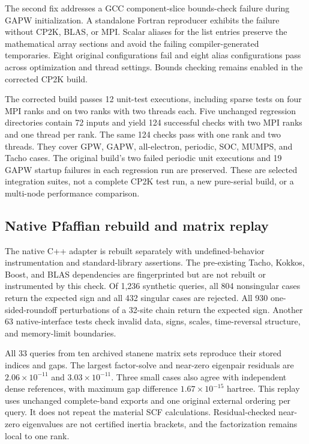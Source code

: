 \documentclass[11pt]{article}
\begin{document}
The second fix addresses a GCC component-slice bounds-check failure
during GAPW initialization. A standalone Fortran reproducer exhibits
the failure without CP2K, BLAS, or MPI. Scalar aliases for the list
entries preserve the mathematical array sections and avoid the failing
compiler-generated temporaries. Eight original configurations fail
and eight alias configurations pass across optimization and thread
settings. Bounds checking remains enabled in the corrected CP2K build.

The corrected build passes 12 unit-test executions, including sparse
tests on four MPI ranks and on two ranks with two threads each.
Five unchanged regression directories contain 72 inputs and yield
124 successful checks with two MPI ranks and one thread per rank.
The same 124 checks pass with one rank and two threads. They cover
GPW, GAPW, all-electron, periodic, SOC, MUMPS, and Tacho cases.
The original build's two failed periodic unit executions and 19 GAPW
startup failures in each regression run are preserved.
These are selected integration suites, not a complete CP2K test run,
a new pure-serial build, or a multi-node performance comparison.

\subsection{Native Pfaffian rebuild and matrix replay}
The native C++ adapter is rebuilt separately with undefined-behavior
instrumentation and standard-library assertions. The pre-existing
Tacho, Kokkos, Boost, and BLAS dependencies are fingerprinted but are
not rebuilt or instrumented by this check.
Of 1,236 synthetic queries, all 804 nonsingular cases return the
expected sign and all 432 singular cases are rejected. All 930
one-sided-roundoff perturbations of a 32-site chain return the expected
sign. Another 63 native-interface tests check invalid data, signs,
scales, time-reversal structure, and memory-limit boundaries.

All 33 queries from ten archived stanene matrix sets reproduce their
stored indices and gaps. The largest factor-solve and near-zero
eigenpair residuals are $2.06\times10^{-11}$ and
$3.03\times10^{-11}$. Three small cases also agree with independent
dense references, with maximum gap difference
$1.67\times10^{-15}$ hartree.
This replay uses unchanged complete-band exports and one original
external ordering per query. It does not repeat the material SCF
calculations. Residual-checked near-zero eigenvalues are not certified
inertia brackets, and the factorization remains local to one rank.
\end{document}
